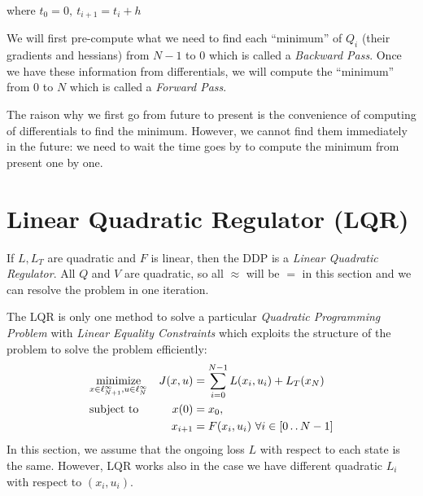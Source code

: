 \documentclass{report}
\newtheorem*{remark}{Remark}
\newcommand{\twodots}{\mathinner {\ldotp \ldotp}}
\begin{document}
where $t_0 = 0, \ t_{i+1} = t_i + h  $

We will first pre-compute what we need to find each ``minimum'' of $Q_i$ (their gradients and hessians) from $N-1$ to $0$ which is called a \emph{Backward Pass}. Once we have these information from differentials, we will compute the ``minimum'' from $0$ to $N$ which is called a \emph{Forward Pass}.

The raison why we first go from future to present is the convenience of computing of differentials to find the minimum. However, we cannot find them immediately in the future: we need to wait the time goes by to compute the minimum from present one by one.

\section{Linear Quadratic Regulator (LQR)}
If $L, L_T$ are quadratic and $F$ is linear, then the DDP is a \emph{Linear Quadratic Regulator}. All $Q$ and $V$ are quadratic, so all $\approx$ will be $=$ in this section and we can resolve the problem in one iteration.

The LQR is only one method to solve a particular \emph{Quadratic Programming Problem} with \emph{Linear Equality Constraints} which exploits the structure of the problem to solve the problem efficiently:
\begin{equation}
\begin{aligned}
&\underset{x \in \ell_{N+1}^\infty, u \in \ell_{N}^\infty}{\text{minimize}}          &J(x, u) &=\sum_{i = 0}^{N-1} L(x_i, u_i) + L_T(x_N) \\
&\text{subject to}       &x(0)      &= x_0,  \\ %
&							      &x_{i+1}  &= F(x_i, u_i) \ \forall i \in [0 \twodots N-1]
\end{aligned}
\end{equation}
In this section, we assume that the ongoing loss $L$ with respect to each state is the same. However, LQR works also in the case we have different quadratic $L_i$ with respect to $(x_i, u_i)$.
\end{document}
